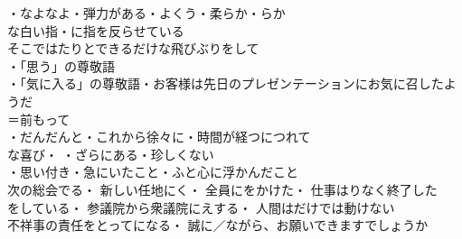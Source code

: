 ・なよなよ・弾力がある・よくう・柔らか・らか\\
な白い指・に指を反らせている\\
そこではたりとできるだけな飛びぶりをして\\

・「思う」の尊敬語\\
・「気に入る」の尊敬語・お客様は先日のプレゼンテーションにお気に召したようだ\\

＝前もって\\
・だんだんと・これから徐々に・時間が経つにつれて\\

な喜び・
・ざらにある・珍しくない\\
・思い付き・急にいたこと・ふと心に浮かんだこと\\

次の総会でる・
新しい任地にく・
全員にをかけた・
仕事はりなく終了した\\
をしている・
参議院から衆議院にえする・
人間はだけでは動けない\\
不祥事の責任をとってになる・
誠に／ながら、お願いできますでしょうか\\
